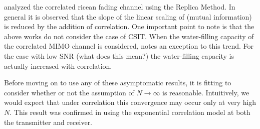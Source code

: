 \cite{taricco2008asymptotic} analyzed the correlated ricean fading channel using the Replica Method. 
In general it is observed that the slope of the linear scaling of (mutual information) is reduced by the addition of correlation. 
One important point to note is that the above works do not consider the case of CSIT. When the water-filling capacity of the 
correlated MIMO channel is considered,  \cite{chuah2002capacity} notes an exception to this trend. For the case with low
SNR (what does this mean?) the water-filling capacity is actually increased with correlation.
\par
Before moving on to use any of these asymptomatic results, it is fitting to consider whether or not the assumption of  $N \rightarrow \infty$ is reasonable. Intuitively, we would expect that under correlation this convergence may occur only at very high $N$. This result was confirmed in  \cite{martin2004asymptotic} using the exponential correlation model at both the transmitter and receiver. 




